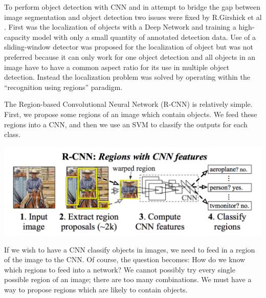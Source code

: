 To perform object detection with CNN and in attempt to bridge the gap between image segmentation and object detection two issues were fixed by R.Girshick et al \cite{Girshick_2014}. First was the localization of objects with a Deep Network and training a high-capacity model with only a small quantity of annotated detection data. Use of a sliding-window detector was proposed for the localization of object but was not preferred because it can only work for one object detection and all objects in an image have to have a common aspect ratio for its use in multiple object detection. Instead the localization problem was solved by operating within the “recognition using regions” paradigm.

The Region-based Convolutional Neural Network (R-CNN) is relatively simple. First, we propose some regions of an image which contain objects. We feed these regions into a CNN, and then we use an SVM to classify the outputs for each class.

\begin{center}
	\includegraphics[scale=0.3]{images/rcnn.png}
\end{center}

If we wish to have a CNN classify objects in images, we need to feed in a region of the image to the CNN. Of course, the question becomes: How do we know which regions to feed into a network? We cannot possibly try every single possible region of an image; there are too many combinations. We must have a way to propose regions which are likely to contain objects.

